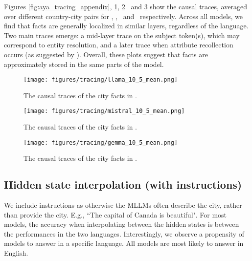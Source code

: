 Figures \ref{fig:aya_tracing_appendix}, \ref{fig:llama_tracing_appendix}, \ref{fig:mistral_tracing_appendix} \ and \ref{fig:gemma_tracing_appendix} show the causal traces, averaged over different country-city pairs for \aya, \llama, \mistral \ and \gemma \ respectively. 
Across all models, we find that facts are generally localized in similar layers, regardless of the language. 
Two main traces emerge: a mid-layer trace on the subject token(s), which may correspond to entity resolution, and a later trace when attribute recollection occurs (as suggested by \citet{nanda2023factfinding}).
Overall, these plots suggest that facts are approximately stored in the same parts of the model.

\begin{figure}[h]
    \centering
    \texttt{[image: figures/tracing/llama\_10\_5\_mean.png]}
    \caption{The causal traces of the city facts in \llama. }
    \label{fig:llama_tracing_appendix}
\end{figure}


\begin{figure}[h]
    \centering
    \texttt{[image: figures/tracing/mistral\_10\_5\_mean.png]}
    \caption{The causal traces of the city facts in \mistral. }
    \label{fig:mistral_tracing_appendix}
\end{figure}


\begin{figure}[h]
    \centering
    \texttt{[image: figures/tracing/gemma\_10\_5\_mean.png]}
    \caption{The causal traces of the city facts in \gemma. }
    \label{fig:gemma_tracing_appendix}
\end{figure}

\FloatBarrier
\newpage 

\subsection{Hidden state interpolation (with instructions)} \label{sec:hidden_state_interpolation}

We include instructions as otherwise the MLLMs often describe the city, rather than provide the city. E.g., ``The capital of Canada is beautiful". 
For most models, the accuracy when interpolating between the hidden states is between the performances in the two languages. Interestingly, we observe a propensity of models to answer in a specific language. All models are most likely to answer in English. 

